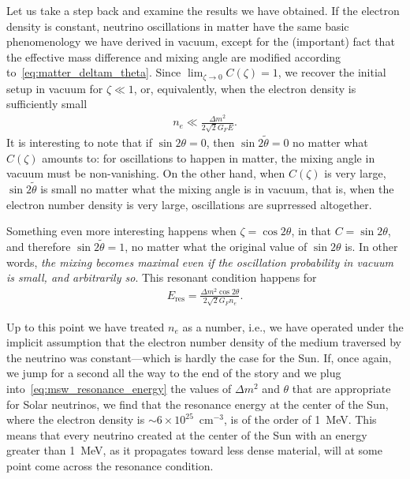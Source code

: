 Let us take a step back and examine the results we have obtained. If the electron
density is constant, neutrino oscillations in matter have the same basic phenomenology
we have derived in vacuum, except for the (important) fact that the effective mass
difference and mixing angle are modified according to~\eqref{eq:matter_deltam_theta}.
Since $\lim_{\zeta \rightarrow 0} C(\zeta) = 1$, we recover the initial setup in vacuum for
$\zeta \ll 1$, or, equivalently, when the electron density is sufficiently
small
\begin{align*}
  n_e \ll \frac{\Delta m^2}{2\sqrt{2}G_F E}.
\end{align*}
It is interesting to note that if $\sin 2\theta = 0$, then $\sin 2\tilde{\theta} = 0$
no matter what $C(\zeta)$ amounts to: for oscillations to happen in matter, the mixing
angle in vacuum must be non-vanishing. On the other hand, when $C(\zeta)$ is very large,
$\sin 2\tilde{\theta}$ is small no matter what the mixing angle is in vacuum, that is,
when the electron number density is very large, oscillations are suprressed
altogether.

Something even more interesting happens when $\zeta = \cos 2\theta$, in that $C = \sin 2\theta$, and therefore $\sin 2\tilde{\theta} = 1$,
no matter what the original value of $\sin 2\theta$ is. In other words, \emph{the
mixing becomes maximal even if the oscillation probability in vacuum is small, and
arbitrarily so}. This resonant condition happens for
\begin{align}\label{eq:msw_resonance_energy}
  E_\text{res} = \frac{\Delta m^2 \cos 2\theta}{2\sqrt{2}G_F n_e}.
\end{align}

Up to this point we have treated $n_e$ as a number, i.e., we have operated under
the implicit assumption that the electron number density of the medium traversed by
the neutrino was constant---which is hardly the case for the Sun. If, once again, we
jump for a second all the way to the end of the story and we plug into~\eqref{eq:msw_resonance_energy}
the values of $\Delta m^2$ and $\theta$ that are appropriate for Solar neutrinos,
we find that the resonance energy at the center of the Sun, where the electron density
is $\sim 6 \times 10^{25}$~cm$^{-3}$, is of the order of 1~MeV. This means that every
neutrino created at the center of the Sun with an energy greater than 1~MeV, as it
propagates toward less dense material, will at some point come across the resonance
condition.

